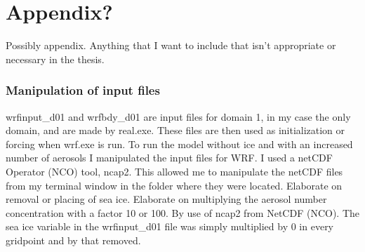 \chapter{Appendix?}
Possibly appendix. Anything that I want to include that isn't appropriate or necessary in the thesis.

\subsection{Manipulation of input files}
wrfinput\_d01 and wrfbdy\_d01 are input files for domain 1, in my case the only domain, and are made by real.exe. These files are then used as initialization or forcing when wrf.exe is run.
To run the model without ice and with an increased number of aerosols I manipulated the input files for WRF. I used a netCDF Operator (NCO) tool, ncap2. This allowed me to manipulate the netCDF files from my terminal window in the folder where they were located.
Elaborate on removal or placing of sea ice. Elaborate on multiplying the aerosol number concentration with a factor 10 or 100. By use of ncap2 from NetCDF (NCO).
The sea ice variable in the wrfinput\_d01 file was simply multiplied by 0 in every gridpoint and by that removed. 


